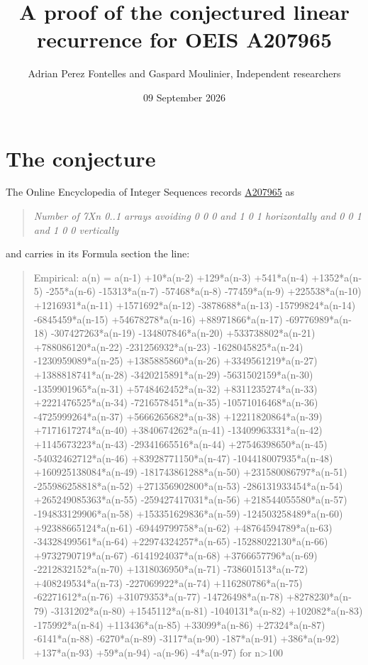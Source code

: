 \documentclass[11pt]{article}
\title{A proof of the conjectured linear recurrence for OEIS A207965}
\author{Adrian Perez Fontelles and Gaspard Moulinier, Independent researchers}
\date{09 September 2026}
\theoremstyle{definition}
\begin{document}
\maketitle
\section{The conjecture}

The Online Encyclopedia of Integer Sequences records \href{https://oeis.org/A207965}{A207965} as

\begin{quote}\itshape Number of 7Xn 0..1 arrays avoiding 0 0 0 and 1 0 1 horizontally and 0 0 1 and 1 0 0 vertically\end{quote}

and carries in its Formula section the line:

\begin{quote}\ttfamily Empirical: a(n) = a(n-1) +10*a(n-2) +129*a(n-3) +541*a(n-4) +1352*a(n-5) -255*a(n-6) -15313*a(n-7) -57468*a(n-8) -77459*a(n-9) +225538*a(n-10) +1216931*a(n-11) +1571692*a(n-12) -3878688*a(n-13) -15799824*a(n-14) -6845459*a(n-15) +54678278*a(n-16) +88971866*a(n-17) -69776989*a(n-18) -307427263*a(n-19) -134807846*a(n-20) +533738802*a(n-21) +788086120*a(n-22) -231256932*a(n-23) -1628045825*a(n-24) -1230959089*a(n-25) +1385885860*a(n-26) +3349561219*a(n-27) +1388818741*a(n-28) -3420215891*a(n-29) -5631502159*a(n-30) -1359901965*a(n-31) +5748462452*a(n-32) +8311235274*a(n-33) +2221476525*a(n-34) -7216578451*a(n-35) -10571016468*a(n-36) -4725999264*a(n-37) +5666265682*a(n-38) +12211820864*a(n-39) +7171617274*a(n-40) +3840674262*a(n-41) -13409963331*a(n-42) +1145673223*a(n-43) -29341665516*a(n-44) +27546398650*a(n-45) -54032462712*a(n-46) +83928771150*a(n-47) -104418007935*a(n-48) +160925138084*a(n-49) -181743861288*a(n-50) +231580086797*a(n-51) -255986258818*a(n-52) +271356902800*a(n-53) -286131933454*a(n-54) +265249085363*a(n-55) -259427417031*a(n-56) +218544055580*a(n-57) -194833129906*a(n-58) +153351629836*a(n-59) -124503258489*a(n-60) +92388665124*a(n-61) -69449799758*a(n-62) +48764594789*a(n-63) -34328499561*a(n-64) +22974324257*a(n-65) -15288022130*a(n-66) +9732790719*a(n-67) -6141924037*a(n-68) +3766657796*a(n-69) -2212832152*a(n-70) +1318036950*a(n-71) -738601513*a(n-72) +408249534*a(n-73) -227069922*a(n-74) +116280786*a(n-75) -62271612*a(n-76) +31079353*a(n-77) -14726498*a(n-78) +8278230*a(n-79) -3131202*a(n-80) +1545112*a(n-81) -1040131*a(n-82) +102082*a(n-83) -175992*a(n-84) +113436*a(n-85) +33099*a(n-86) +27324*a(n-87) -6141*a(n-88) -6270*a(n-89) -3117*a(n-90) -187*a(n-91) +386*a(n-92) +137*a(n-93) +59*a(n-94) -a(n-96) -4*a(n-97) for n>100\end{quote}
\end{document}
